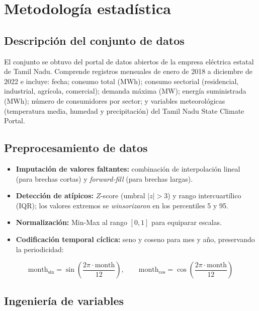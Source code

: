 \section*{Metodología estadística}

\subsection*{Descripción del conjunto de datos}

El conjunto se obtuvo del portal de datos abiertos de la empresa eléctrica estatal de Tamil Nadu. Comprende registros mensuales de enero de 2018 a diciembre de 2022 e incluye: fecha; consumo total (MWh); consumo sectorial (residencial, industrial, agrícola, comercial); demanda máxima (MW); energía suministrada (MWh); número de consumidores por sector; y variables meteorológicas (temperatura media, humedad y precipitación) del Tamil Nadu State Climate Portal.


\subsection*{Preprocesamiento de datos}

\begin{itemize}
  \item \textbf{Imputación de valores faltantes:} combinación de interpolación lineal (para brechas cortas) y \textit{forward-fill} (para brechas largas).
  \item \textbf{Detección de atípicos:} $Z$-score (umbral $|z|>3$) y rango intercuartílico (IQR); los valores extremos se \textit{winsorizaron} en los percentiles 5 y 95.
  \item \textbf{Normalización:} Min-Max al rango $[0,1]$ para equiparar escalas.
  \item \textbf{Codificación temporal cíclica:} seno y coseno para mes y año, preservando la periodicidad:
\end{itemize}
\[ \text{month}_{\sin}=\sin\!\left(\frac{2\pi\cdot\text{month}}{12}\right),\qquad
   \text{month}_{\cos}=\cos\!\left(\frac{2\pi\cdot\text{month}}{12}\right) \]

\subsection*{Ingeniería de variables}

